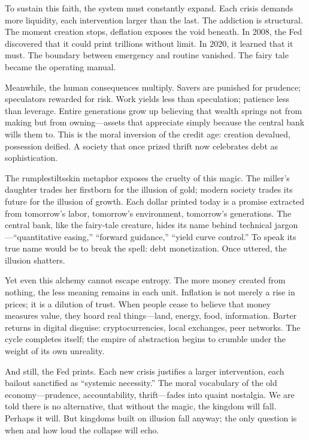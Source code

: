 \documentclass[11pt,twoside]{book}
\begin{document}
To sustain this faith, the system must constantly expand.  
Each crisis demands more liquidity, each intervention larger than the last.  
The addiction is structural.  
The moment creation stops, deflation exposes the void beneath.  
In 2008, the Fed discovered that it could print trillions without limit.  
In 2020, it learned that it must.  
The boundary between emergency and routine vanished.  
The fairy tale became the operating manual.

Meanwhile, the human consequences multiply.  
Savers are punished for prudence; speculators rewarded for risk.  
Work yields less than speculation; patience less than leverage.  
Entire generations grow up believing that wealth springs not from making but from owning—assets that appreciate simply because the central bank wills them to.  
This is the moral inversion of the credit age: creation devalued, possession deified.  
A society that once prized thrift now celebrates debt as sophistication.

The rumplestiltsskin metaphor exposes the cruelty of this magic.  
The miller’s daughter trades her firstborn for the illusion of gold; modern society trades its future for the illusion of growth.  
Each dollar printed today is a promise extracted from tomorrow’s labor, tomorrow’s environment, tomorrow’s generations.  
The central bank, like the fairy-tale creature, hides its name behind technical jargon—“quantitative easing,” “forward guidance,” “yield curve control.”  
To speak its true name would be to break the spell: debt monetization.  
Once uttered, the illusion shatters.

Yet even this alchemy cannot escape entropy.  
The more money created from nothing, the less meaning remains in each unit.  
Inflation is not merely a rise in prices; it is a dilution of trust.  
When people cease to believe that money measures value, they hoard real things—land, energy, food, information.  
Barter returns in digital disguise: cryptocurrencies, local exchanges, peer networks.  
The cycle completes itself; the empire of abstraction begins to crumble under the weight of its own unreality.

And still, the Fed prints.  
Each new crisis justifies a larger intervention, each bailout sanctified as “systemic necessity.”  
The moral vocabulary of the old economy—prudence, accountability, thrift—fades into quaint nostalgia.  
We are told there is no alternative, that without the magic, the kingdom will fall.  
Perhaps it will.  
But kingdoms built on illusion fall anyway; the only question is when and how loud the collapse will echo.
\end{document}
